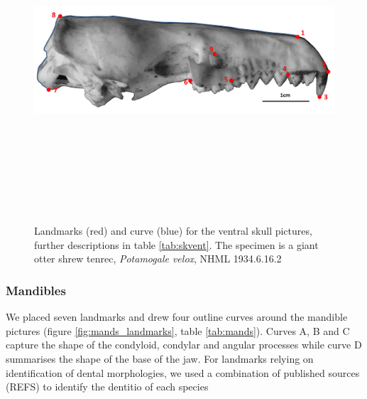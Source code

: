 \documentclass[12pt,a4paper]{article}
\begin{document}
	\begin{figure}[H] 
 	\centering
  	\includegraphics[width=12cm, height=12cm, keepaspectratio=true]
  	{figures/sklat_landmarks_pot_vel.png}
    \caption {Landmarks (red) and curve (blue) for the ventral skull pictures, further descriptions in table \ref{tab:skvent}. The specimen is a giant otter shrew tenrec, \textit{Potamogale velox}, NHML 1934.6.16.2}
  	\label{fig:sklat_landmarks}
  	\end{figure}


	\begin{table}[h]
	\caption{Descriptions of the landmarks (points) and curves (semilandmarks) for the skulls in lateral view (see Figure \ref{fig:sklat_landmarks}.} 
	
	\label{tab:sklat}
	\end{table}
\subsubsection{Mandibles}
	
	We placed seven landmarks and drew four outline curves around the mandible pictures (figure \ref{fig:mands_landmarks}, table \ref{tab:mands}). Curves A, B and C capture the shape of the condyloid, condylar and angular processes while curve D summarises the shape of the base of the jaw. For landmarks relying on identification of dental morphologies, we used a combination of published sources (REFS) to identify the dentitio of each species
\end{document}
